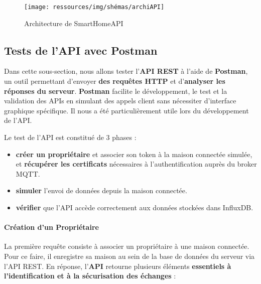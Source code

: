 \documentclass[10pt, a4paper]{report}
\begin{document}
	\begin{figure}[h!]
		\centering
		\texttt{[image: ressources/img/shémas/archiAPI]}
		\caption{Architecture de SmartHomeAPI}
		\label{fig:archAPI}
	\end{figure}
	
	
	\subsection{Tests de l'API avec Postman}
	
	Dans cette sous-section, nous allons tester l’\textbf{API REST} à l’aide de \textbf{Postman}, un outil permettant d’envoyer \textbf{des requêtes HTTP} et d’\textbf{analyser les réponses du serveur}. \textbf{Postman} facilite le développement, le test et la validation des APIs en simulant des appels client sans nécessiter d’interface graphique spécifique. Il nous a été particulièrement utile lors du développement de l'API.
	
	Le test de l'API est constitué de 3 phases :
	\begin{itemize}
		\item \textbf{créer un propriétaire} et associer son token à la maison connectée simulée, et \textbf{récupérer les certificats} nécessaires à l’authentification auprès du broker MQTT.
		\item \textbf{simuler} l’envoi de données depuis la maison connectée.
		\item \textbf{vérifier} que l’API accède correctement aux données stockées dans InfluxDB.
	\end{itemize}
	
	

	
	\paragraph{Création d'un Propriétaire\\} 
	La première requête consiste à associer un propriétaire à une maison connectée. Pour ce faire, il enregistre sa maison au sein de la base de données du serveur via l’API REST. En réponse, l’\textbf{API} retourne plusieurs éléments \textbf{essentiels à l’identification et à la sécurisation des échanges} :
	
\end{document}
